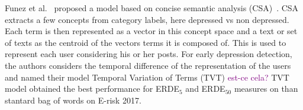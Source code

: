 \documentclass[graybox]{svmult}
\newcommand{\fr}[1]{\textcolor{brown}{#1}}
\newcommand{\jm}[1]{\textcolor{purple}{{  #1}}}
\begin{document}
Funez et al.~\cite{ErrecaldeVFUC17} proposed a model based on concise semantic analysis (CSA)~\cite{LI2011441}. CSA extracts a few concepts from category labels, here depressed vs non depressed. Each term is then represented as a vector in this concept space and a text or set of texts as the centroid of the  vectors terms it is composed of. This is used to represent each user considering his or her posts. For early depression detection, the authors considers the temporal difference of the representation of the users and named their model Temporal Variation of Terms (TVT) \jm{est-ce cela?}
 TVT model obtained the best performance for ERDE$_{5}$ and ERDE$_{50}$ measures on than stantard bag of words on E-risk 2017.
\end{document}

